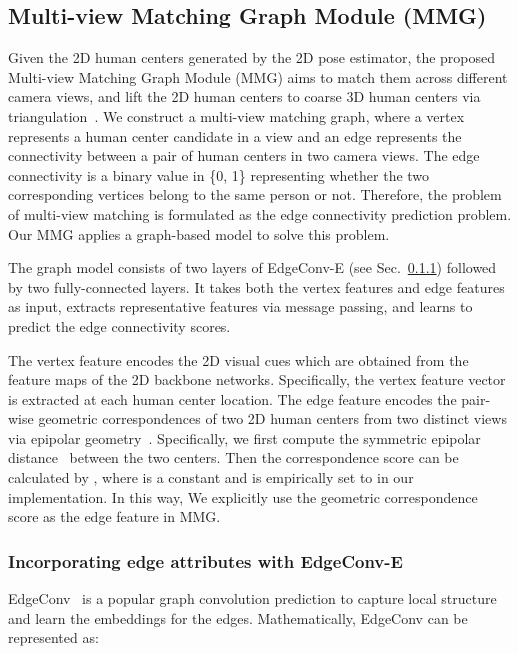 \documentclass[10pt,twocolumn,letterpaper]{article}
\begin{document}
\subsection{Multi-view Matching Graph Module (MMG)}\label{sec:MMG}

Given the 2D human centers generated by the 2D pose estimator, the proposed Multi-view Matching Graph Module (MMG) aims to match them across different camera views, and lift the 2D human centers to coarse 3D human centers via triangulation~\cite{andrew2001multiple}. We construct a multi-view matching graph, where a vertex represents a human center candidate in a view and an edge represents the connectivity between a pair of human centers in two camera views. The edge connectivity is a binary value in \{0, 1\} representing whether the two corresponding vertices belong to the same person or not. Therefore, the problem of multi-view matching is formulated as the edge connectivity prediction problem. 
Our MMG applies a graph-based model to solve this problem.

The graph model consists of two layers of EdgeConv-E (see Sec.~\ref{sec:edgeconv}) followed by two fully-connected layers. 
 It takes both the vertex features and edge features as input, extracts representative features via message passing, and learns to predict the edge connectivity scores. 

The vertex feature encodes the 2D visual cues which are obtained from the feature maps of the 2D backbone networks. Specifically, the vertex feature vector  is extracted at each human center location. The edge feature encodes the pair-wise geometric correspondences of two 2D human centers from two distinct views via epipolar geometry~\cite{andrew2001multiple}. Specifically, we first compute the symmetric epipolar distance~\cite{andrew2001multiple}  between the two centers. Then the correspondence score  can be calculated by , where  is a constant and is empirically set to  in our implementation. In this way, We explicitly use the geometric correspondence score  as the edge feature in MMG. 


\subsubsection{Incorporating edge attributes with EdgeConv-E}
\label{sec:edgeconv}
EdgeConv~\cite{wang2019dynamic} is a popular graph convolution prediction to capture local structure and learn the embeddings for the edges. Mathematically, EdgeConv can be represented as:
\end{document}

